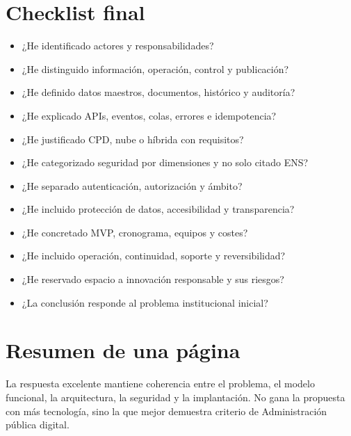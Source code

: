 \documentclass[11pt,a4paper]{article}
\begin{document}
\section{Checklist final}
\begin{itemize}
\item ¿He identificado actores y responsabilidades?
\item ¿He distinguido información, operación, control y publicación?
\item ¿He definido datos maestros, documentos, histórico y auditoría?
\item ¿He explicado APIs, eventos, colas, errores e idempotencia?
\item ¿He justificado CPD, nube o híbrida con requisitos?
\item ¿He categorizado seguridad por dimensiones y no solo citado ENS?
\item ¿He separado autenticación, autorización y ámbito?
\item ¿He incluido protección de datos, accesibilidad y transparencia?
\item ¿He concretado MVP, cronograma, equipos y costes?
\item ¿He incluido operación, continuidad, soporte y reversibilidad?
\item ¿He reservado espacio a innovación responsable y sus riesgos?
\item ¿La conclusión responde al problema institucional inicial?
\end{itemize}

\section{Resumen de una página}

\begin{center}
\end{center}

La respuesta excelente mantiene coherencia entre el problema, el modelo funcional, la arquitectura, la seguridad y la implantación. No gana la propuesta con más tecnología, sino la que mejor demuestra criterio de Administración pública digital.
\end{document}
